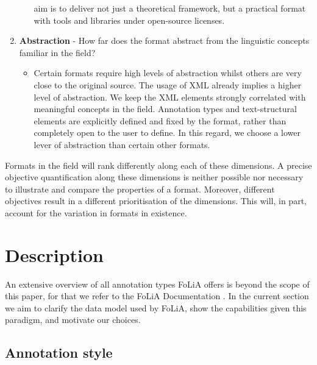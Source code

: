\documentclass[a4paper,10pt,twoside]{article}
\begin{document}
\begin{enumerate}
\begin{itemize}
      aim is to deliver not just a theoretical framework, but a practical
      format with tools and libraries under open-source licenses.
  \end{itemize}
\item \textbf{Abstraction} - How far does the format abstract from the
  linguistic concepts familiar in the field?
  \begin{itemize}
    \item[] Certain formats require high levels of abstraction whilst others are
      very close to the original source. The usage of XML already implies a higher level of abstraction. We keep
      the XML elements strongly correlated with meaningful concepts in the
      field. Annotation types and text-structural elements are explicitly
      defined and fixed by the format, rather than completely open to the user
      to define. In this regard, we choose a lower lever of abstraction than
      certain other formats. 
  \end{itemize}
\end{enumerate}

Formats in the field will rank differently along each of these dimensions. A
precise objective quantification along these dimensions is neither possible nor
necessary to illustrate and compare the properties of a format. Moreover,
different objectives result in a different prioritisation of the dimensions.
This will, in part, account for the variation in formats in existence.


\section{Description}
\label{sec:description}

An extensive overview of all annotation types FoLiA offers is beyond the scope of this
paper, for that we refer to the FoLiA Documentation \cite{FOLIA}. In the
current section we aim to clarify the data model used by FoLiA, show the
capabilities given this paradigm, and motivate our choices.

\subsection{Annotation style}
\end{document}
